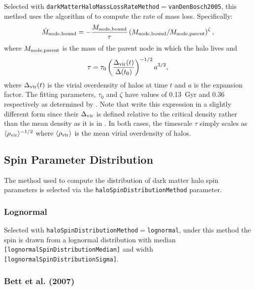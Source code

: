 Selected with {\tt darkMatterHaloMassLossRateMethod}$=${\tt vanDenBosch2005}, this method uses the algorithm of \cite{van_den_bosch_mass_2005} to compute the rate of mass loss. Specifically:
\begin{equation}
\dot{M}_{\rm node,bound} = -{M_{\rm node,bound}\over \tau} \left({M_{\rm node,bound} / M_{\rm node,parent}}\right)^\zeta,
\end{equation}
where $M_{\rm node,parent}$ is the mass of the parent node in which the halo lives and
\begin{equation}
\tau = \tau_0 \left({\Delta_{\rm vir}(t) \over \Delta(t_0)}\right)^{-1/2} a^{3/2},
\end{equation}
where $\Delta_{\rm vir}(t)$ is the virial overdensity of halos at time $t$ and $a$ is the expansion factor. The fitting parameters, $\tau_0$ and $\zeta$ have values of 0.13~Gyr and 0.36 respectively as determined by \cite{van_den_bosch_mass_2005}. Note that  \cite{van_den_bosch_mass_2005} write this expression in a slightly different form since their $\Delta_{\rm vir}$ is defined relative to the critical density rather than the mean density as it is in \glc. In both cases, the timescale $\tau$ simply scales as $\langle \rho_{\rm vir} \rangle ^{-1/2}$ where $\langle \rho_{\rm vir} \rangle$ is the mean virial overdensity of halos.

\subsection{Spin Parameter Distribution}\label{sec:SpinParameterDistribution}

The method used to compute the distribution of dark matter halo spin parameters is selected via the {\tt haloSpinDistributionMethod} parameter.

\subsubsection{Lognormal}

Selected with {\tt haloSpinDistributionMethod}$=${\tt lognormal}, under this method the spin is drawn from a lognormal distribution with median {\tt [lognormalSpinDistributionMedian]} and width {\tt [lognormalSpinDistributionSigma]}.

\subsubsection{Bett et al. (2007)}

